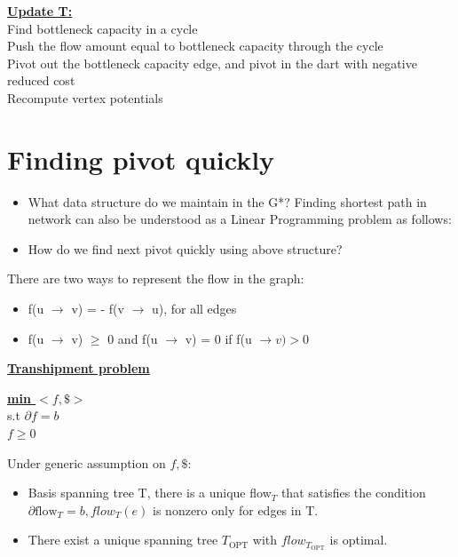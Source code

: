 \documentclass{article}
\begin{document}
\begin{center}
\begin{algorithm}
\textbf{\underline{Update T:}} \\ \quad
  Find bottleneck capacity in a cycle \\ \quad
  Push the flow amount equal to bottleneck capacity through the cycle \\ \quad
  Pivot out the bottleneck capacity edge, and pivot in the dart with negative reduced cost \\ \quad
  Recompute vertex potentials
\end{algorithm}
\end{center}

\section{Finding pivot quickly}
\begin{itemize}
\item What data structure do we maintain in the G*?
Finding shortest path in network can also be understood as a Linear Programming problem as follows:

\item How do we find next pivot quickly using above structure?
\end{itemize}

There are two ways to represent the flow in the graph:
\begin{itemize}
\item f(u $\rightarrow$ v) = - f(v $\rightarrow$ u), for all edges
\item f(u $\rightarrow$ v) $\geq$ 0 and f(u $\rightarrow$ v) = 0 if f(u $\rightarrow v) > 0$
\end{itemize}

\textbf{\underline{Transhipment problem}}

\begin{center}
\begin{algorithm}
\textbf{\underline{min $<f, \$>$}} \\
  s.t  $\partial f = b$ \\ \qquad
       $f \geq 0$
\end{algorithm}
\end{center}

Under generic assumption on $f, \$$:
\begin{itemize}
\item Basis spanning tree T, there is a unique flow$_T$ that satisfies the 
condition $\partial \text{flow}_T = b, flow_T (e)$ is nonzero only for edges in T.
\item There exist a unique spanning tree $T_{\text{OPT}}$ with $flow_{T_\text{OPT}}$ 
is optimal.
\end{itemize}
\end{document}
